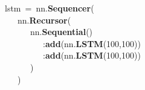 \noindent
\mbox{}lstm\ =\ nn.\textbf{Sequencer}( \\
\mbox{}\ \ \ nn.\textbf{Recursor}( \\
\mbox{}\ \ \ \ \ \ nn.\textbf{Sequential}() \\
\mbox{}\ \ \ \ \ \ \ \ \ :\textbf{add}(nn.\textbf{LSTM}(100,100)) \\
\mbox{}\ \ \ \ \ \ \ \ \ :\textbf{add}(nn.\textbf{LSTM}(100,100)) \\
\mbox{}\ \ \ \ \ \ ) \\
\mbox{}\ \ \ )
